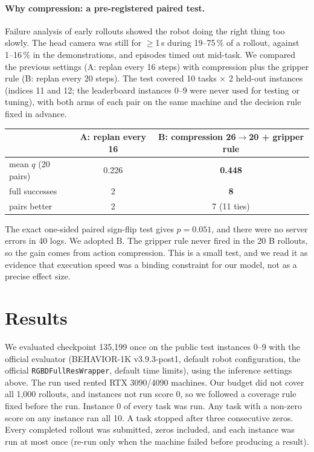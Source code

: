 \documentclass[10pt]{article}
\begin{document}
\paragraph{Why compression: a pre-registered paired test.} Failure analysis of early rollouts showed the robot doing
the right thing too slowly. The head camera was still for $\ge$1\,s during 19--75\,\% of a rollout, against 1--16\,\%
in the demonstrations, and episodes timed out mid-task. We compared the previous settings (A: replan every 16 steps)
with compression plus the gripper rule (B: replan every 20 steps). The test covered 10 tasks $\times$ 2 held-out
instances (indices 11 and 12; the leaderboard instances 0--9 were never used for testing or tuning), with both arms
of each pair on the same machine and the decision rule fixed in advance.

\begin{center}\small
\begin{tabular}{@{}lcc@{}}
\toprule
 & A: replan every 16 & B: compression 26$\to$20 + gripper rule \\
\midrule
mean $q$ (20 pairs) & 0.226 & \textbf{0.448} \\
full successes & 2 & \textbf{8} \\
pairs better & 2 & 7 (11 ties) \\
\bottomrule
\end{tabular}
\end{center}

\noindent The exact one-sided paired sign-flip test gives $p=0.051$, and there were no server errors in 40 logs. We
adopted B. The gripper rule never fired in the 20 B rollouts, so the gain comes from action compression. This is a
small test, and we read it as evidence that execution speed was a binding constraint for our model, not as a precise
effect size.

\section{Results}
\label{sec:results}
We evaluated checkpoint 135{,}199 once on the public test instances 0--9 with the official evaluator (BEHAVIOR-1K
v3.9.3-post1, default robot configuration, the official \texttt{RGBDFullResWrapper}, default time limits), using the
inference settings above. The run used rented RTX 3090/4090 machines. Our budget did not cover all 1{,}000 rollouts,
and instances not run score 0, so we followed a coverage rule fixed before the run. Instance 0 of every task was run.
Any task with a non-zero score on any instance ran all 10. A task stopped after three consecutive zeros. Every
completed rollout was submitted, zeros included, and each instance was run at most once (re-run only when the machine
failed before producing a result).
\end{document}
